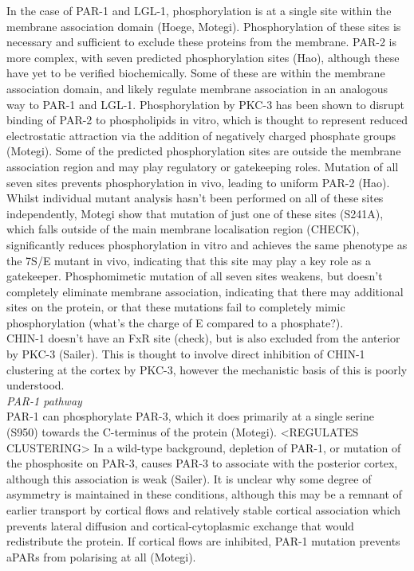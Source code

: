 \documentclass[12pt]{"article"}
\begin{document}
In the case of PAR-1 and LGL-1, phosphorylation is at a single site within the membrane association domain (Hoege, Motegi). Phosphorylation of these sites is necessary and sufficient to exclude these proteins from the membrane. PAR-2 is more complex, with seven predicted phosphorylation sites (Hao), although these have yet to be verified biochemically. Some of these are within the membrane association domain, and likely regulate membrane association in an analogous way to PAR-1 and LGL-1. Phosphorylation by PKC-3 has been shown to disrupt binding of PAR-2 to phospholipids in vitro, which is thought to represent reduced electrostatic attraction via the addition of negatively charged phosphate groups (Motegi). Some of the predicted phosphorylation sites are outside the membrane association region and may play regulatory or gatekeeping roles. Mutation of all seven sites prevents phosphorylation in vivo, leading to uniform PAR-2 (Hao). Whilst individual mutant analysis hasn’t been performed on all of these sites independently, Motegi show that mutation of just one of these sites (S241A), which falls outside of the main membrane localisation region (CHECK), significantly reduces phosphorylation in vitro and achieves the same phenotype as the 7S/E mutant in vivo, indicating that this site may play a key role as a gatekeeper. Phosphomimetic mutation of all seven sites weakens, but doesn’t completely eliminate membrane association, indicating that there may additional sites on the protein, or that these mutations fail to completely mimic phosphorylation (what’s the charge of E compared to a phosphate?). \\

CHIN-1 doesn’t have an FxR site (check), but is also excluded from the anterior by PKC-3 (Sailer). This is thought to involve direct inhibition of CHIN-1 clustering at the cortex by PKC-3, however the mechanistic basis of this is poorly understood.\\

\textit{PAR-1 pathway} \\

PAR-1 can phosphorylate PAR-3, which it does primarily at a single serine (S950) towards the C-terminus of the protein (Motegi). <REGULATES CLUSTERING> In a wild-type background, depletion of PAR-1, or mutation of the phosphosite on PAR-3, causes PAR-3 to associate with the posterior cortex, although this association is weak (Sailer). It is unclear why some degree of asymmetry is maintained in these conditions, although this may be a remnant of earlier transport by cortical flows and relatively stable cortical association which prevents lateral diffusion and cortical-cytoplasmic exchange that would redistribute the protein. If cortical flows are inhibited, PAR-1 mutation prevents aPARs from polarising at all (Motegi).\\
\end{document}
